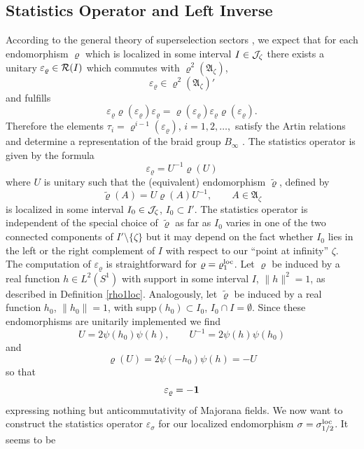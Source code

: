 \documentclass[10pt,a4paper]{article}
\begin{document}
\subsection{Statistics Operator and Left Inverse}
According to the general theory of superselection
sectors \cite{DHR2,FRS1,Haag}, we expect that for each
endomorphism $\varrho$ which is localized in some
interval $I\in{\cal J}_\zeta$ there exists a
unitary $\varepsilon_\varrho\in{\cal R}(I)$
which commutes with $\varrho^2(\mathfrak{A}_\zeta)$,
\[ \varepsilon_\varrho\in\varrho^2(\mathfrak{A}_\zeta)'\]
and fulfills
\begin{equation}
\label{braid}
\varepsilon_\varrho \varrho (\varepsilon_\varrho)
\varepsilon_\varrho = \varrho (\varepsilon_\varrho)
\varepsilon_\varrho \varrho (\varepsilon_\varrho).
\end{equation}
Therefore the elements $\tau_i=\varrho^{i-1}
(\varepsilon_\varrho)$, $i=1,2,\ldots,$ satisfy the
Artin relations and determine a representation of
the braid group $B_\infty$ \cite{DHR2,FRS1}.
The statistics operator is given by the formula
\begin{equation}
\label{stat}
\varepsilon_\varrho = U^{-1}\varrho(U)
\end{equation}
where $U$ is unitary such that the (equivalent)
endomorphism $\tilde{\varrho}$, defined by
\[ \tilde{\varrho}(A)=U\varrho(A)U^{-1},\qquad
A\in\mathfrak{A}_\zeta \]
is localized in some interval
$I_0\in{\cal J}_\zeta$, $I_0\subset I'$. The
statistics operator is independent of the special
choice of $\tilde{\varrho}$ as far as $I_0$ varies
in one of the two connected components of
$I'\setminus\{\zeta\}$ but it may depend on
the fact whether $I_0$ lies in the left or the
right complement of $I$ with respect to our ``point
at infinity'' $\zeta$. The computation of
$\varepsilon_\varrho$ is straightforward for
$\varrho=\varrho_1^{\rm loc}$. Let $\varrho$ be
induced by a real function $h\in L^2(S^1)$ with
support in some interval $I$, $\|h\|^2=1$,
as described in Definition \ref{rho1loc}.
Analogously, let $\tilde{\varrho}$
be induced by a real function $h_0$, $\|h_0\|=1$,
with supp$(h_0)\subset I_0$, $I_0\cap I=\emptyset$.
Since these endomorphisms
are unitarily implemented we find
\[ U=2\psi(h_0)\psi(h),\qquad U^{-1}=
2\psi(h)\psi(h_0) \]
and
\[ \varrho(U) = 2\psi(-h_0)\psi(h)= -U \]
so that
\[ \varepsilon_\varrho = - {\bf 1} \]
expressing nothing but anticommutativity of
Majorana fields.
We now want to construct the statistics operator
$\varepsilon_\sigma$ for our localized endomorphism
$\sigma=\sigma_{1/2}^{\rm loc}$. It seems to be
\end{document}
